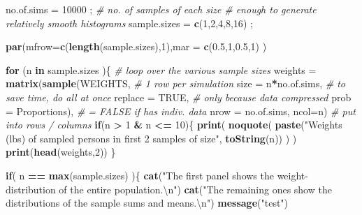 \documentclass[
]{article}
\newenvironment{Shaded}{\begin{snugshade}}{\end{snugshade}}
\newcommand{\CharTok}[1]{\textcolor[rgb]{0.31,0.60,0.02}{#1}}
\newcommand{\CommentTok}[1]{\textcolor[rgb]{0.56,0.35,0.01}{\textit{#1}}}
\newcommand{\ControlFlowTok}[1]{\textcolor[rgb]{0.13,0.29,0.53}{\textbf{#1}}}
\newcommand{\DataTypeTok}[1]{\textcolor[rgb]{0.13,0.29,0.53}{#1}}
\newcommand{\DecValTok}[1]{\textcolor[rgb]{0.00,0.00,0.81}{#1}}
\newcommand{\FloatTok}[1]{\textcolor[rgb]{0.00,0.00,0.81}{#1}}
\newcommand{\KeywordTok}[1]{\textcolor[rgb]{0.13,0.29,0.53}{\textbf{#1}}}
\newcommand{\NormalTok}[1]{#1}
\newcommand{\OperatorTok}[1]{\textcolor[rgb]{0.81,0.36,0.00}{\textbf{#1}}}
\newcommand{\OtherTok}[1]{\textcolor[rgb]{0.56,0.35,0.01}{#1}}
\newcommand{\StringTok}[1]{\textcolor[rgb]{0.31,0.60,0.02}{#1}}
\begin{document}
\begin{Shaded}
\begin{Highlighting}[]
\NormalTok{no.of.sims =}\StringTok{ }\DecValTok{10000}\NormalTok{ ;  }\CommentTok{# no. of samples of each size}
                      \CommentTok{# enough to generate relatively smooth histograms  }
\NormalTok{sample.sizes =}\StringTok{ }\KeywordTok{c}\NormalTok{(}\DecValTok{1}\NormalTok{,}\DecValTok{2}\NormalTok{,}\DecValTok{4}\NormalTok{,}\DecValTok{8}\NormalTok{,}\DecValTok{16}\NormalTok{) ; }

\KeywordTok{par}\NormalTok{(}\DataTypeTok{mfrow=}\KeywordTok{c}\NormalTok{(}\KeywordTok{length}\NormalTok{(sample.sizes),}\DecValTok{1}\NormalTok{),}\DataTypeTok{mar =} \KeywordTok{c}\NormalTok{(}\FloatTok{0.5}\NormalTok{,}\DecValTok{1}\NormalTok{,}\FloatTok{0.5}\NormalTok{,}\DecValTok{1}\NormalTok{) )}

\ControlFlowTok{for}\NormalTok{ (n }\ControlFlowTok{in}\NormalTok{ sample.sizes )\{        }\CommentTok{# loop over the various sample sizes}
\NormalTok{   weights =}\StringTok{ }\KeywordTok{matrix}\NormalTok{(}\KeywordTok{sample}\NormalTok{(WEIGHTS,    }\CommentTok{# 1 row per simulation}
              \DataTypeTok{size =}\NormalTok{ n}\OperatorTok{*}\NormalTok{no.of.sims,     }\CommentTok{# to save time, do all at once}
              \DataTypeTok{replace =} \OtherTok{TRUE}\NormalTok{,          }\CommentTok{# only because data compressed}
              \DataTypeTok{prob =}\NormalTok{ Proportions),     }\CommentTok{# = FALSE if has indiv. data}
          \DataTypeTok{nrow =}\NormalTok{ no.of.sims, }\DataTypeTok{ncol=}\NormalTok{n) }\CommentTok{# put into rows / columns}
   \ControlFlowTok{if}\NormalTok{(n }\OperatorTok{>}\StringTok{ }\DecValTok{1} \OperatorTok{&}\StringTok{ }\NormalTok{n }\OperatorTok{<=}\StringTok{ }\DecValTok{10}\NormalTok{)\{}
     \KeywordTok{print}\NormalTok{( }\KeywordTok{noquote}\NormalTok{(}
      \KeywordTok{paste}\NormalTok{(}\StringTok{"Weights (lbs) of sampled persons in first 2 samples of size"}\NormalTok{,  }
            \KeywordTok{toString}\NormalTok{(n)) )   ) }
     \KeywordTok{print}\NormalTok{(}\KeywordTok{head}\NormalTok{(weights,}\DecValTok{2}\NormalTok{))}
\NormalTok{   \}}
   
   \ControlFlowTok{if}\NormalTok{( n }\OperatorTok{==}\StringTok{ }\KeywordTok{max}\NormalTok{(sample.sizes) )\{}
     \KeywordTok{cat}\NormalTok{(}\StringTok{"The first panel shows the weight-distribution of the entire population.}\CharTok{\textbackslash{}n}\StringTok{"}\NormalTok{)}
     \KeywordTok{cat}\NormalTok{(}\StringTok{"The remaining ones show the  distributions of the sample sums and means.}\CharTok{\textbackslash{}n}\StringTok{"}\NormalTok{)}
     \KeywordTok{message}\NormalTok{(}\StringTok{"test"}\NormalTok{)}
     

\end{Highlighting}
\end{Shaded}
\end{document}
